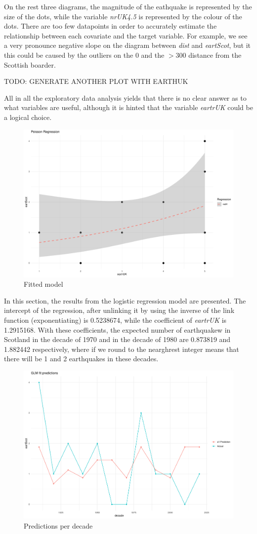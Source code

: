 \documentclass[12pt,a4paper]{article}
\begin{document}
\begin{enumerate}[(a)]
On the rest three diagrams, the magnitude of the eathquake is represented by the size of the dots, while the variable \textit{nrUK4.5} is represented by the colour of the dots. There are too few datapoints in order to accurately estimate the relationship between each covariate and the target variable. For example, we see a very pronounce negative slope on the diagram between \textit{dist} and \textit{eartScot}, but it this could be caused by the outliers on the $0$ and the $>300$ distance from the Scottish boarder. 

TODO: GENERATE ANOTHER PLOT WITH EARTHUK

All in all the exploratory data analysis yields that there is no clear answer as to what variables are useful, although it is hinted that the variable \textit{eartrUK} could be a logical choice.


\begin{figure}[]
    \centering
    \includegraphics[width=0.6\linewidth]{figures/Rplot01.pdf}
    \caption{Fitted model}
    \label{model1}
\end{figure}

In this section, the results from the logistic regression model are presented. The intercept  of the regression, after unlinking it by using the inverse of the link function (exponentiating) is 0.5238674, while the coefficient of \textit{eartrUK} is 1.2915168. With these coefficients, the expected number of earthquakew in Scotland in the decade of 1970 and in the decade of 1980 are 0.873819 and 1.882442 respectively, where if we round to the nearghrest integer means that there will be 1 and 2 earthquakes in these decades. 

\begin{figure}[]
    \centering
    \includegraphics[width=0.6\linewidth]{figures/Rplot02.pdf}
    \caption{Predictions per decade}
    \label{prediction1}
\end{figure}


\end{enumerate}
\end{document}
